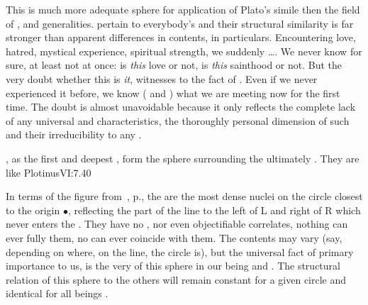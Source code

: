 This is much more adequate sphere for application of Plato's
 simile then the field of ,  and generalities.
  pertain to everybody's  and
their structural similarity is far stronger than apparent differences
in contents, in  particulars.  Encountering
love, hatred, mystical experience, spiritual strength, we suddenly
\ldots {}.  We never know for sure, at least not at once: is {\em
this} love or 
not, is {\em this} sainthood or not. But the very doubt whether this
is {\em it},
witnesses to the fact of .  Even if we never
experienced it before, we know ( and )
what we are meeting now for the first time.  The doubt is almost
unavoidable because it only reflects the complete lack of any
universal and  characteristics, the thoroughly personal
dimension of such  and their irreducibility to any .

\pa %
, as the first and deepest , form the sphere
surrounding the ultimately . They are like
\citet{the intellection that remains within its place of origin;
it has that source as substratum but becomes a sort of addition to
it in that it is an activity of that source perfecting the
potentiality there, not by producing anything but as being a
completing power to the principle in which it inheres.}{Plotinus}{VI:7.40}

In terms of the figure from~, p.\pageref{fig:levels}, the
 are the most dense nuclei on the circle closest to the origin
$\bullet$, reflecting the part of the line to the left of L and right of R which
never enters the . They have no
, nor even {objectifiable} correlates, nothing  can
ever fully  them, no  can ever coincide with them.
The  contents may vary (say, depending on where, on the line, the
circle is), but the universal fact of primary importance to us, is the very
 of this sphere in our being and . The structural relation of
this sphere to the others will remain constant for a given circle and identical
for all beings .


